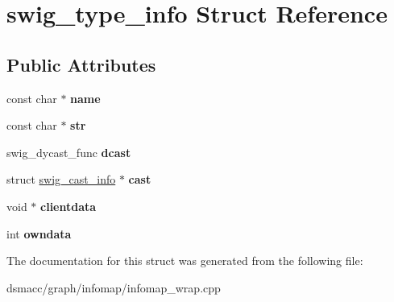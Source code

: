 \hypertarget{structswig__type__info}{}\section{swig\+\_\+type\+\_\+info Struct Reference}
\label{structswig__type__info}
\subsection*{Public Attributes}
\begin{DoxyCompactItemize}
\item 
\mbox{\label{structswig__type__info_a90a9c6a25aa3e923978005ecbe23ad60}} 
const char $\ast$ {\bfseries name}
\item 
\mbox{\label{structswig__type__info_abbe7cc58a083feb4329b748643324064}} 
const char $\ast$ {\bfseries str}
\item 
\mbox{\label{structswig__type__info_a07df4bedf85be77b23756b531b60e0dd}} 
swig\+\_\+dycast\+\_\+func {\bfseries dcast}
\item 
\mbox{\label{structswig__type__info_a3ee3f7ef20e965b6c798d79723a96f9b}} 
struct \mbox{\hyperlink{structswig__cast__info}{swig\+\_\+cast\+\_\+info}} $\ast$ {\bfseries cast}
\item 
\mbox{\label{structswig__type__info_a19bdd65dceb89cd54befd3ded06558b7}} 
void $\ast$ {\bfseries clientdata}
\item 
\mbox{\label{structswig__type__info_a93c25d5903cbfcb82208eea7227c32bd}} 
int {\bfseries owndata}
\end{DoxyCompactItemize}


The documentation for this struct was generated from the following file\+:\begin{DoxyCompactItemize}
\item 
dsmacc/graph/infomap/infomap\+\_\+wrap.\+cpp\end{DoxyCompactItemize}
